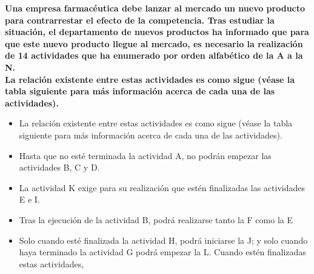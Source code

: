 \documentclass{report}
\begin{document}
\begin{raggedright}
	\textbf{Una empresa farmacéutica debe lanzar al mercado un nuevo producto para contrarrestar el efecto de la competencia. 
	Tras estudiar la situación, el departamento de nuevos productos ha informado que para que este nuevo producto llegue 
	al mercado, es necesario la realización de 14 actividades que ha enumerado por orden alfabético de la A a la N.\\
	\vspace{1\baselineskip}
	La relación existente entre estas actividades es como sigue (véase la tabla siguiente para más información acerca de cada una de las actividades).}\\

	 \begin{itemize}[label=--]
		\item La relación existente entre estas actividades es como sigue (véase la tabla siguiente para más información acerca de cada una de las actividades). 
		\item Hasta que no esté terminada la actividad A, no podrán empezar las actividades B, C y D. 
		\item La actividad K exige para su realización que estén finalizadas las actividades E e I. 
		\item Tras la ejecución de la actividad B, podrá realizarse tanto la F como la E
		\item Solo cuando esté finalizada la actividad H, podrá iniciarse la J; y solo cuando haya terminado la actividad G podrá empezar la L. Cuando estén finalizadas estas actividades,  
	 \end{itemize}


\end{raggedright}
\end{document}
